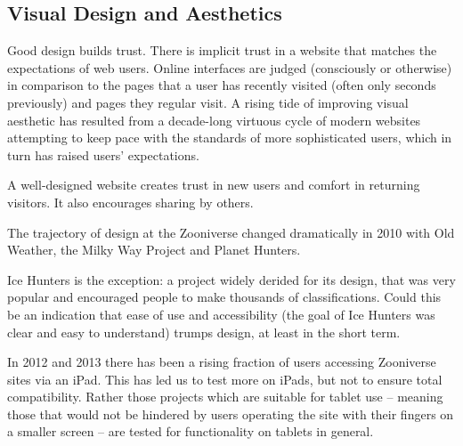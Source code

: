 \documentclass{sigchi}
\begin{document}



\subsection{Visual Design and Aesthetics}



Good design builds trust. There is implicit trust in a website that matches the expectations of web users. Online interfaces are judged (consciously or otherwise) in comparison to the pages that a user has recently visited (often only seconds previously) and pages they regular visit. A rising tide of improving visual aesthetic has resulted from a decade-long virtuous cycle of modern websites attempting to keep pace with the standards of more sophisticated users, which in turn has raised users' expectations.

A well-designed website creates trust in new users and comfort in returning visitors. It also encourages sharing by others.

The trajectory of design at the Zooniverse changed dramatically in 2010 with Old Weather, the Milky Way Project and Planet Hunters. %

Ice Hunters is the exception: a project widely derided for its design, that was very popular and encouraged people to make thousands of classifications. Could this be an indication that ease of use and accessibility (the goal of Ice Hunters was clear and easy to understand) trumps design, at least in the short term.

In 2012 and 2013 there has been a rising fraction of users accessing Zooniverse sites via an iPad. This has led us to test more on iPads, but not to ensure total compatibility. Rather those projects which are suitable for tablet use -- meaning those that would not be hindered by users operating the site with their fingers on a smaller screen -- are tested for functionality on tablets in general.
\end{document}
